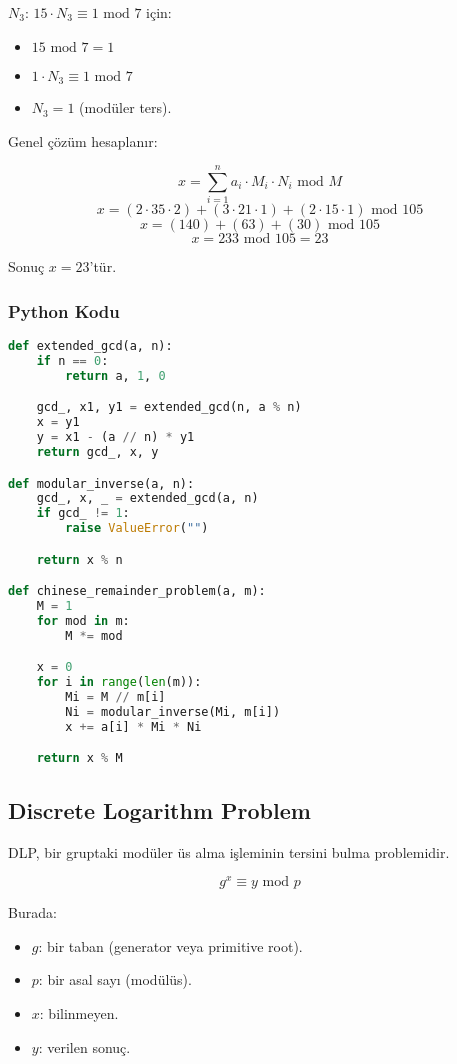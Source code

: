 $N_3$: $15 \cdot N_3 \equiv 1 \text{ mod } 7$ için:

\begin{itemize}
    \item $15 \text{ mod } 7 = 1$
    \item $1 \cdot N_3 \equiv 1 \text{ mod } 7$
    \item $N_3 = 1$ (modüler ters).
\end{itemize}

Genel çözüm hesaplanır:

\[ x = \sum_{i=1}^{n} a_i \cdot M_i \cdot N_i \text{ mod } M \]
\[ x = (2 \cdot 35 \cdot 2) + (3 \cdot 21 \cdot 1) + (2 \cdot 15 \cdot 1) \text{ mod } 105 \]
\[ x = (140) + (63) + (30) \text{ mod } 105 \]
\[ x = 233 \text{ mod } 105 = 23 \]

Sonuç $x = 23$'tür.

\subsubsection{Python Kodu}

\begin{lstlisting}[language=Python]
def extended_gcd(a, n):
    if n == 0:
        return a, 1, 0

    gcd_, x1, y1 = extended_gcd(n, a % n)
    x = y1
    y = x1 - (a // n) * y1
    return gcd_, x, y

def modular_inverse(a, n):
    gcd_, x, _ = extended_gcd(a, n)
    if gcd_ != 1:
        raise ValueError("")

    return x % n

def chinese_remainder_problem(a, m):
    M = 1
    for mod in m:
        M *= mod

    x = 0
    for i in range(len(m)):
        Mi = M // m[i]
        Ni = modular_inverse(Mi, m[i])
        x += a[i] * Mi * Ni

    return x % M
\end{lstlisting}

\newpage

\subsection{Discrete Logarithm Problem}

DLP, bir gruptaki modüler üs alma işleminin tersini bulma problemidir.

\[ g^x \equiv y \text{ mod } p \]

Burada:

\begin{itemize}
    \item $g$: bir taban (generator veya primitive root).
    \item $p$: bir asal sayı (modülüs).
    \item $x$: bilinmeyen.
    \item $y$: verilen sonuç.
\end{itemize}

